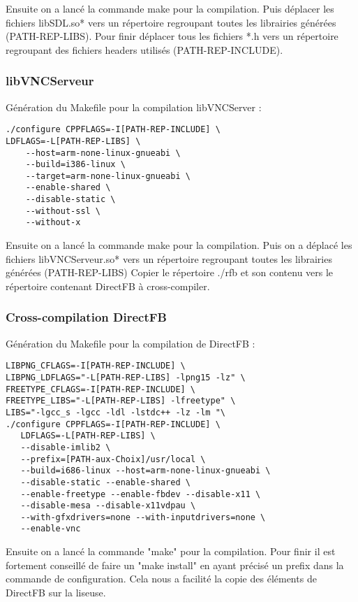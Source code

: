 Ensuite on a lancé la commande make pour la compilation.
Puis déplacer les fichiers libSDL.so* vers un répertoire regroupant toutes les librairies générées (PATH-REP-LIBS).
Pour finir déplacer tous les fichiers *.h vers un répertoire regroupant des fichiers headers utilisés (PATH-REP-INCLUDE).

\subsubsection{libVNCServeur}

Génération du Makefile pour la compilation libVNCServer :

\begin{lstlisting}
./configure CPPFLAGS=-I[PATH-REP-INCLUDE] \
LDFLAGS=-L[PATH-REP-LIBS] \  
	--host=arm-none-linux-gnueabi \
	--build=i386-linux \
	--target=arm-none-linux-gnueabi \ 
	--enable-shared \
	--disable-static \
	--without-ssl \
	--without-x
\end{lstlisting}

Ensuite on a lancé la commande make pour la compilation.
Puis on a déplacé les fichiers libVNCServeur.so* vers un répertoire regroupant toutes les librairies générées (PATH-REP-LIBS)
Copier le répertoire ./rfb et son contenu vers le répertoire contenant DirectFB à cross-compiler.

\subsubsection{Cross-compilation DirectFB}

Génération du Makefile pour la compilation de DirectFB :

\begin{lstlisting}
LIBPNG_CFLAGS=-I[PATH-REP-INCLUDE] \
LIBPNG_LDFLAGS="-L[PATH-REP-LIBS] -lpng15 -lz" \
FREETYPE_CFLAGS=-I[PATH-REP-INCLUDE] \
FREETYPE_LIBS="-L[PATH-REP-LIBS] -lfreetype" \
LIBS="-lgcc_s -lgcc -ldl -lstdc++ -lz -lm "\
./configure CPPFLAGS=-I[PATH-REP-INCLUDE] \
   LDFLAGS=-L[PATH-REP-LIBS] \
   --disable-imlib2 \
   --prefix=[PATH-aux-Choix]/usr/local \
   --build=i686-linux --host=arm-none-linux-gnueabi \
   --disable-static --enable-shared \
   --enable-freetype --enable-fbdev --disable-x11 \
   --disable-mesa --disable-x11vdpau \
   --with-gfxdrivers=none --with-inputdrivers=none \
   --enable-vnc
\end{lstlisting}

Ensuite on a lancé la commande "make" pour la compilation. Pour finir il est fortement conseillé de faire un "make install" en ayant précisé un prefix dans la commande de configuration. Cela nous a facilité la copie des éléments de DirectFB sur la liseuse. 

